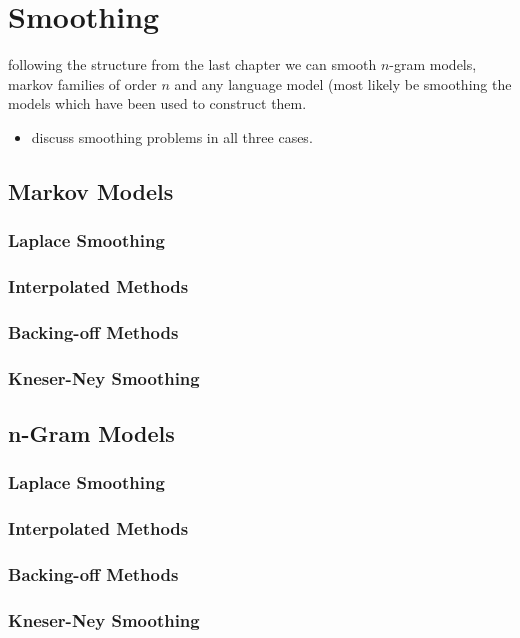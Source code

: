 \documentclass[•]{book}
\begin{document}
\chapter{Smoothing}
following the structure from the last chapter we can smooth $n$-gram models, markov families of order $n$ and any language model (most likely be smoothing the models which have been used to construct them. 

\begin{itemize}
\item discuss smoothing problems in all three cases.
\end{itemize}
\section{Markov Models}
\subsection{Laplace Smoothing}
\subsection{Interpolated Methods}
\subsection{Backing-off Methods}
\subsection{Kneser-Ney Smoothing}

\section{n-Gram Models}
\subsection{Laplace Smoothing}
\subsection{Interpolated Methods}
\subsection{Backing-off Methods}
\subsection{Kneser-Ney Smoothing}
\end{document}
